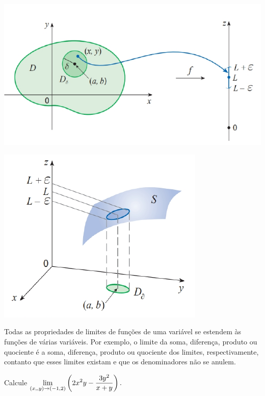 \begin{frame}[label=limites]
	\begin{center}
		\includegraphics[scale=0.5]{figuras/limite1.png}

		\includegraphics[scale=0.5]{figuras/limite2.png}

	\end{center}
\end{frame}


\begin{frame}[label=limites]
		Todas as propriedades de limites de funções  de uma variável se estendem às funções de várias variáveis. Por exemplo, o limite da soma, diferença, produto ou quociente é a soma, diferença, produto ou quociente dos limites, respectivamente, contanto que esses limites existam e que os denominadores não se anulem.
		\begin{exe} Calcule 
			$\displaystyle\lim_{(x,,y)\to(-1,2)}\left(2x^2y-\frac{3y^2}{x+y}\right).$
	\end{exe}
\end{frame}


